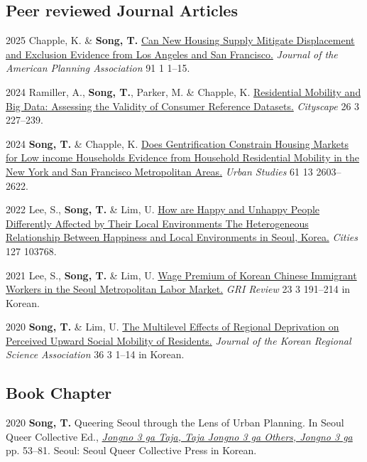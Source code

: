 \documentclass[10pt,letterpaper]{article}
\begin{document}
\subsection{Peer reviewed Journal Articles}
\begin{tablist}
  \item[2025] \tab{}Chapple, K. \& \textbf{Song, T.} \href{https://doi.org/10.1080/01944363.2024.2319293}{Can New Housing Supply Mitigate Displacement and Exclusion Evidence from Los Angeles and San Francisco.} \emph{Journal of the American Planning Association} 91 1 1–15.

  \item[2024] \tab{}Ramiller, A., \textbf{Song, T.}, Parker, M. \& Chapple, K. \href{https://www.jstor.org/stable/48799257}{Residential Mobility and Big Data: Assessing the Validity of Consumer Reference Datasets.} \emph{Cityscape} 26 3 227–239.

  \item[2024] \tab{}\textbf{Song, T.} \& Chapple, K. \href{https://doi.org/10.1177/00420980241244699}{Does Gentrification Constrain Housing Markets for Low income Households Evidence from Household Residential Mobility in the New York and San Francisco Metropolitan Areas.} \emph{Urban Studies} 61 13 2603–2622.

  \item[2022] \tab{}Lee, S., \textbf{Song, T.} \& Lim, U. \href{https://doi.org/10.1016/j.cities.2022.103768}{How are Happy and Unhappy People Differently Affected by Their Local Environments The Heterogeneous Relationship Between Happiness and Local Environments in Seoul, Korea.} \emph{Cities} 127 103768.

  \item[2021] \tab{}Lee, S., \textbf{Song, T.} \& Lim, U. \href{https://www.dbpia.co.kr/Journal/articleDetail?nodeId=NODE11025769}{Wage Premium of Korean Chinese Immigrant Workers in the Seoul Metropolitan Labor Market.} \emph{GRI Review} 23 3 191–214 in Korean.

  \item[2020] \tab{}\textbf{Song, T.} \& Lim, U. \href{https://www.koreascience.or.kr/article/JAKO202030161655441.page}{The Multilevel Effects of Regional Deprivation on Perceived Upward Social Mobility of Residents.} \emph{Journal of the Korean Regional Science Association} 36 3 1–14 in Korean.
\end{tablist}

\subsection{Book Chapter}
\begin{tablist}
  \item[2020] \tab{}\textbf{Song, T.} Queering Seoul through the Lens of Urban Planning. In Seoul Queer Collective Ed., \emph{\href{http://www.kyobobook.co.kr/product/detailViewKor.laf?ejkGb=KOR&mallGb=KOR&barcode=9791197096501}{Jongno 3 ga Taja, Taja Jongno 3 ga Others, Jongno 3 ga}} pp. 53–81. Seoul: Seoul Queer Collective Press in Korean.
\end{tablist}
\end{document}
